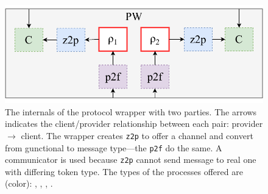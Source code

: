 \begin{figure}
\centering
\includegraphics[scale=0.5]{figures/blankpartywrapper2.pdf}
\caption{The internals of the protocol wrapper with two parties. The arrows indicates the client/provider relationship between each pair: provider $\rightarrow$ client. The wrapper creates \texttt{z2p} to offer a channel and convert from gunctional to message type---the \texttt{p2f} do the same. A communicator is used because \texttt{z2p} cannot send message to real one with differing token type. The types of the processes offered are (color): , , , . }
\label{fig:blankpartywrapper}
\vspace{-1.5em}
\end{figure}


